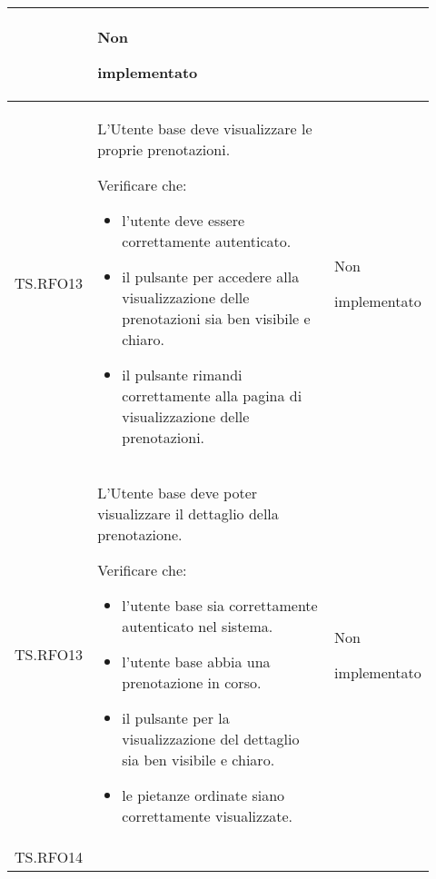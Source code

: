 \begin{longtable}{|p{0.10\linewidth}|p{0.70\linewidth}|p{0.12\linewidth}|}
\begin{itemize}
	\end{itemize}                                             &
	Non \par implementato                                                                                                                                                   \\
	\hline
	TS.RFO13                                                                                                                        &
	L'Utente base deve visualizzare le proprie prenotazioni. \par
	Verificare che:
	\begin{itemize}
		\item l'utente deve essere correttamente autenticato.
		\item il pulsante per accedere alla visualizzazione delle prenotazioni sia ben visibile e chiaro.
		\item il pulsante rimandi correttamente alla pagina di visualizzazione delle prenotazioni.
	\end{itemize}                               &
	Non \par implementato                                                                                                                                                   \\
	\hline
	TS.RFO13                                                                                                                        &
	L’Utente base deve poter visualizzare il dettaglio della prenotazione.   \par
	Verificare che:
	\begin{itemize}
		\item l'utente base sia correttamente autenticato nel sistema.
		\item l'utente base abbia una prenotazione in corso.
		\item il pulsante per la visualizzazione del dettaglio sia ben visibile e chiaro.
		\item le pietanze ordinate siano correttamente visualizzate.
	\end{itemize}                                               &
	Non \par implementato                                                                                                                                                   \\
	\hline
	TS.RFO14                                                                                                                        &

\end{longtable}
